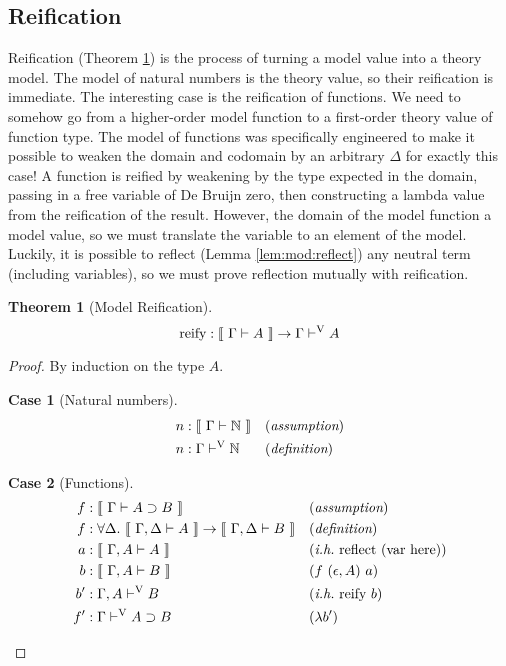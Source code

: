 \documentclass[preprint,nonatbib]{sigplanconf}
\numberwithin{subdefin}{defin}
\theoremstyle{definition}
\newtheorem{theorem}{Theorem}
\numberwithin{subtheorem}{theorem}
\numberwithin{sublemma}{theorem}
\numberwithin{corollary}{theorem}
\numberwithin{case}{theorem}
\numberwithin{slcase}{sublemma}
\newtheorem{scase}{Case}
\numberwithin{scase}{subtheorem}
\numberwithin{lcase}{lemma}
\newcommand{\refthm}[1]{Theorem \ref{thm:#1}}
\newcommand{\reflem}[1]{Lemma \ref{lem:#1}}
\def\arr{\supset}
\def\marr{\rightarrow}
\def\lam{\lambda}
\def\nat{\mathbb{N}}
\def\emp{\epsilon}
\def\bydef{(\textit{definition})}
\def\byass{(\textit{assumption})}
\newcommand{\ih}[1]{(\textit{i.h.}~ #1)}
\newcommand{\by}[1]{(#1)}
\newcommand{\turn}[1]{\vdash^\con{#1}}
\newcommand{\all}[1]{\forall#1.~}
\newcommand{\el}[1]{\llbracket ~ #1 ~ \rrbracket}
\newcommand{\con}[1]{\textmd{#1}}
\newcommand{\fun}[1]{\textmd{#1}}
\newcommand{\typm}[1]{\el{\Gamma \vdash #1}}
\newcommand{\gdtypm}[1]{\el{\Gamma, \Delta \vdash #1}}
\newcommand{\gatypm}[1]{\el{\Gamma, A \vdash #1}}
\newcommand{\typv}[1]{\Gamma \turn{V} #1}
\newcommand{\gatypv}[1]{\Gamma, A \turn{V} #1}
\begin{document}
\subsection{Reification}

Reification (\refthm{mod:reify}) is the process of turning a model value into a theory
model. The model of natural numbers is the theory value, so their
reification is immediate. The interesting case is the reification of
functions. We need to somehow go from a higher-order model function to
a first-order theory value of function type. The model of functions
was specifically engineered to make it possible to weaken the domain
and codomain by an arbitrary $\Delta$ for exactly this case! A
function is reified by weakening by the type expected in the domain,
passing in a free variable of De Bruijn zero, then constructing a
lambda value from the reification of the result. However, the domain
of the model function a model value, so we must translate the variable
to an element of the model. Luckily, it is possible to
reflect (\reflem{mod:reflect}) any neutral term (including variables),
so we must prove reflection mutually with reification.

\begin{theorem}[Model Reification]
\label{thm:mod:reify}
$$
\fun{reify} : \typm{A} \marr \typv{A}
$$

\begin{proof}

By induction on the type $A$.

\begin{scase}[Natural numbers]
\begin{align*}
n  &: \typm{\nat} && \byass\\
n  &: \typv{\nat} && \bydef
\end{align*}
\end{scase}

\begin{scase}[Functions]
\begin{align*}
f &: \typm{A \arr B} && \byass\\
f &: \all{\Delta} \gdtypm{A} \marr \gdtypm{B} && \bydef\\
a &: \gatypm{A} && \ih{\fun{reflect}~(\con{var here})}\\
b &: \gatypm{B} && \by{f~(\emp, A)~a}\\
b' &: \gatypv{B} && \ih{\fun{reify}~b}\\
f' &: \typv{A \arr B} && \by{\lam b'}
\end{align*}
\end{scase}

\end{proof}

\end{theorem}
\end{document}

